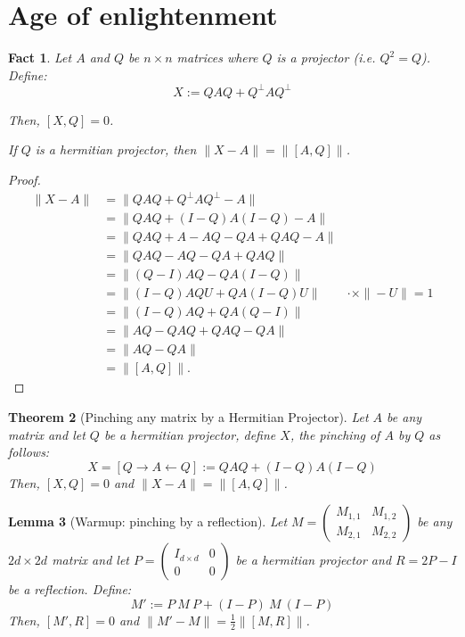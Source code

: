 \documentclass[12pt]{article}
\theoremstyle{plain}
\newtheorem{theorem}{Theorem}[section]
\newtheorem{lemma}[theorem]{Lemma}
\newtheorem{fact}[theorem]{Fact}
\begin{document}
\newpage

\section{Age of enlightenment}
\begin{fact}
    Let $A$ and $Q$ be $n \times n$ matrices where $Q$ is a projector (i.e. $Q^2 = Q$). Define:
    \begin{equation}
        X := QAQ + Q^\bot AQ^\bot
    \end{equation}
    
    \noindent Then, $[X, Q] = 0$.
    
    \noindent If $Q$ is a hermitian projector, then $\|X - A\| = \|[A,Q]\|$.
\end{fact}
\begin{proof}
    \begin{align*}
    \| X - A \| &= \| QAQ + Q^\bot A Q^\bot - A\|\\
    &= \| QAQ + (I-Q)A(I-Q) - A \|\\
    &= \| QAQ + A - AQ - QA + QAQ - A \|\\
    &= \| QAQ - AQ - QA + QAQ \|\\
    &= \|(Q - I)AQ - QA(I - Q) \|\\
    &= \|(I - Q)AQU + QA(I - Q) U \| & \cdot \times \|-U\| = 1\\
    &= \|(I - Q)AQ + QA(Q - I) \|\\
    &= \| AQ - QAQ + QAQ - QA\|\\
    &= \| AQ - QA\|\\
    &= \|[A, Q] \|.
\end{align*}
\end{proof}
\begin{theorem}[Pinching any matrix by a Hermitian Projector]
Let $A$ be any matrix and let $Q$ be a hermitian projector, define $X$, the pinching of $A$ by $Q$ as follows:
\begin{equation}
	X = [Q \to A \gets Q] := Q A Q + (I - Q) A (I - Q)
\end{equation}
Then, $[X, Q] = 0$ and $\|X - A\| = \|[A, Q]\|$.
\end{theorem}
\begin{lemma}[Warmup: pinching by a reflection]
    Let $M = \begin{pmatrix}
        M_{1,1} & M_{1,2}\\
        M_{2,1} & M_{2,2}
    \end{pmatrix}$ be any $2d \times 2d$ matrix and let $P = \begin{pmatrix}
        I_{d \times d} & 0\\ 0 & 0
    \end{pmatrix}$ be a hermitian projector and $R = 2P - I$ be a reflection. Define:
    \begin{equation}
        M' := P\ M\ P + (I - P)\ M\ (I - P)
    \end{equation}
    Then, $[M', R] = 0$ and $\|M' - M \| = \frac{1}{2} \|[M, R]\|$.
\end{lemma}
\end{document}
